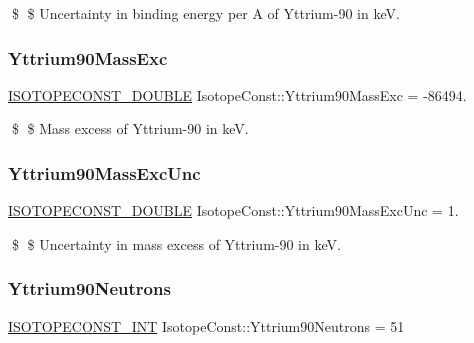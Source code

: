 \$ \$ Uncertainty in binding energy per A of Yttrium-\/90 in keV. \mbox{\label{group___isotope_const-_yttrium-_y90_gad9efb4364a916e875096fe646fc2bc62}} 
\subsubsection{\texorpdfstring{Yttrium90\+Mass\+Exc}{Yttrium90MassExc}}
{\footnotesize\ttfamily \mbox{\hyperlink{group___isotope_const-_macros_ga8f45a7272ce02c0b4c65c44636ed719a}{I\+S\+O\+T\+O\+P\+E\+C\+O\+N\+S\+T\+\_\+\+D\+O\+U\+B\+LE}} Isotope\+Const\+::\+Yttrium90\+Mass\+Exc = -\/86494.}

\$ \$ Mass excess of Yttrium-\/90 in keV. \mbox{\label{group___isotope_const-_yttrium-_y90_ga5b6ec6cf8fcfa4e0cdca7dbbfdd56149}} 
\subsubsection{\texorpdfstring{Yttrium90\+Mass\+Exc\+Unc}{Yttrium90MassExcUnc}}
{\footnotesize\ttfamily \mbox{\hyperlink{group___isotope_const-_macros_ga8f45a7272ce02c0b4c65c44636ed719a}{I\+S\+O\+T\+O\+P\+E\+C\+O\+N\+S\+T\+\_\+\+D\+O\+U\+B\+LE}} Isotope\+Const\+::\+Yttrium90\+Mass\+Exc\+Unc = 1.}

\$ \$ Uncertainty in mass excess of Yttrium-\/90 in keV. \mbox{\label{group___isotope_const-_yttrium-_y90_gaa0e7475783249c4e1c0eaf0f9a605cce}} 
\subsubsection{\texorpdfstring{Yttrium90\+Neutrons}{Yttrium90Neutrons}}
{\footnotesize\ttfamily \mbox{\hyperlink{group___isotope_const-_macros_ga5f18360b3e99483a35c32d789e62621c}{I\+S\+O\+T\+O\+P\+E\+C\+O\+N\+S\+T\+\_\+\+I\+NT}} Isotope\+Const\+::\+Yttrium90\+Neutrons = 51}

